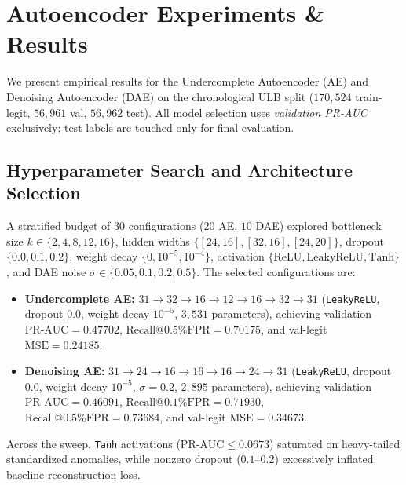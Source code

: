 
\section{Autoencoder Experiments \& Results}
\label{sec:p2_ae_results}

We present empirical results for the Undercomplete Autoencoder (AE) and
Denoising Autoencoder (DAE) on the chronological ULB split
($170{,}524$ train-legit, $56{,}961$ val, $56{,}962$ test).  All model
selection uses \emph{validation PR-AUC} exclusively; test labels are touched
only for final evaluation.

\subsection{Hyperparameter Search and Architecture Selection}
\label{sec:ae_hp_search}

A stratified budget of $30$ configurations ($20$ AE, $10$ DAE) explored
bottleneck size $k \in \{2,4,8,12,16\}$, hidden widths
$\{[24,16],[32,16],[24,20]\}$, dropout $\{0.0, 0.1, 0.2\}$, weight decay
$\{0, 10^{-5}, 10^{-4}\}$, activation $\{\text{ReLU}, \text{LeakyReLU}, \text{Tanh}\}$,
and DAE noise $\sigma \in \{0.05, 0.1, 0.2, 0.5\}$.
The selected configurations are:
\begin{itemize}
    \item \textbf{Undercomplete AE:} $31 \to 32 \to 16 \to 12 \to 16 \to 32 \to 31$
          (\texttt{LeakyReLU}, dropout $0.0$, weight decay $10^{-5}$, $3{,}531$
          parameters), achieving validation $\text{PR-AUC} = 0.47702$,
          $\text{Recall@0.5\% FPR} = 0.70175$, and val-legit $\text{MSE} = 0.24185$.
    \item \textbf{Denoising AE:} $31 \to 24 \to 16 \to 16 \to 16 \to 24 \to 31$
          (\texttt{LeakyReLU}, dropout $0.0$, weight decay $10^{-5}$, $\sigma = 0.2$,
          $2{,}895$ parameters), achieving validation $\text{PR-AUC} = 0.46091$,
          $\text{Recall@0.1\% FPR} = 0.71930$, $\text{Recall@0.5\% FPR} = 0.73684$,
          and val-legit $\text{MSE} = 0.34673$.
\end{itemize}
Across the sweep, \texttt{Tanh} activations ($\text{PR-AUC} \le 0.0673$) saturated
on heavy-tailed standardized anomalies, while nonzero dropout ($0.1$--$0.2$)
excessively inflated baseline reconstruction loss.


